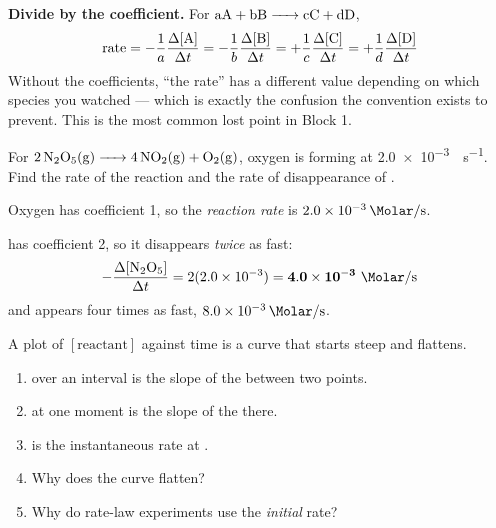 \documentclass{apchem-notes}
\begin{document}
\begin{apctrap}
\textbf{Divide by the coefficient.} For $\ce{aA + bB -> cC + dD}$,
\[ \text{rate} = -\frac{1}{a}\frac{\Delta[\ce{A}]}{\Delta t}
   = -\frac{1}{b}\frac{\Delta[\ce{B}]}{\Delta t}
   = +\frac{1}{c}\frac{\Delta[\ce{C}]}{\Delta t}
   = +\frac{1}{d}\frac{\Delta[\ce{D}]}{\Delta t} \]
Without the coefficients, ``the rate'' has a different value depending on
which species you watched --- which is exactly the confusion the convention
exists to prevent. This is the most common lost point in Block 1.
\end{apctrap}

\begin{workedexample}
For $\ce{2N2O5(g) -> 4NO2(g) + O2(g)}$, oxygen is forming at
\SI{2.0e-3}{\Molar\per\second}. Find the rate of the reaction and the rate
of disappearance of .

Oxygen has coefficient 1, so the \emph{reaction rate} is
$\SI{2.0e-3}{\Molar\per\second}$.

 has coefficient 2, so it disappears \emph{twice} as fast:
\[ -\frac{\Delta[\ce{N2O5}]}{\Delta t} = 2(2.0\times10^{-3})
   = \mathbf{4.0\times10^{-3}}~\si{\Molar\per\second} \]
and  appears four times as fast,
$\SI{8.0e-3}{\Molar\per\second}$.
\end{workedexample}


A plot of $[\text{reactant}]$ against time is a curve that starts steep and
flattens.

\begin{enumerate}[leftmargin=*,itemsep=0.35em]
  \item {} over an interval is the slope of the
         between two points.
  \item {} at one moment is the slope of the
         there.
  \item {} is the instantaneous rate at
        .
  \item Why does the curve flatten? 
  \item Why do rate-law experiments use the \emph{initial} rate?
\end{enumerate}
\end{document}
